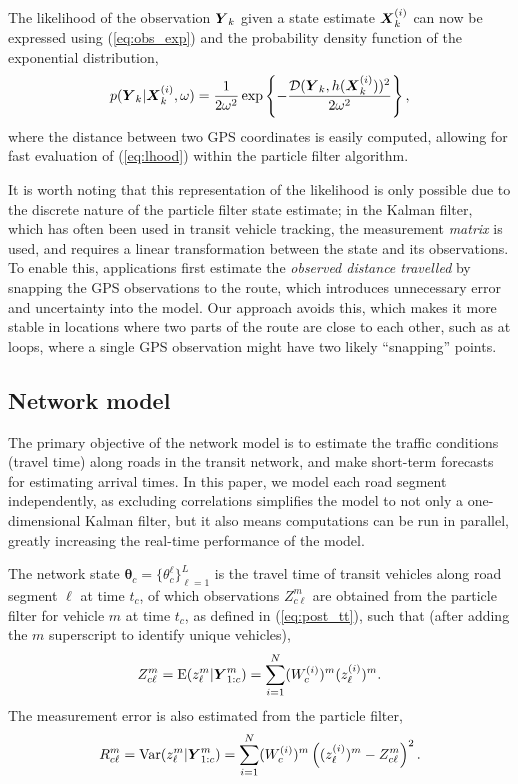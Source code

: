 The likelihood of the observation $\mbox{$\boldsymbol{Y}$}_k$ given a state estimate $\mbox{$\boldsymbol{X}$}_k^{(i)}$
can now be expressed using (\ref{eq:obs_exp}) 
and the probability density function of the exponential distribution,
\begin{equation}
\label{eq:lhood}
p(\mbox{$\boldsymbol{Y}$}_k | \mbox{$\boldsymbol{X}$}_k^{(i)}, \omega) =
\frac{1}{2\omega^2}\exp\left\{
    -\frac{\mathcal{D}(\mbox{$\boldsymbol{Y}$}_k, h(\mbox{$\boldsymbol{X}$}_k^{(i)}))^2}{2\omega^2}
\right\},
\end{equation}
where the distance between two GPS coordinates is easily computed,
allowing for fast evaluation of (\ref{eq:lhood}) within the particle filter algorithm.


It is worth noting that this representation of the likelihood is only
possible due to the discrete nature of the particle filter state estimate;
in the Kalman filter, which has often been used in transit vehicle tracking,
the measurement \emph{matrix} is used, and requires a linear
transformation between the state and its observations.
To enable this, applications first estimate the \emph{observed distance travelled}
by snapping the GPS observations to the route,
which introduces unnecessary error and uncertainty into the model.
Our approach avoids this, which makes it more stable in locations where two 
parts of the route are close to each other,
such as at loops, where a single GPS observation might have two likely ``snapping'' points.


\subsection{Network model}
\label{sec:kf}

The primary objective of the network model is to estimate the \rt traffic conditions
(travel time) along roads in the transit network, 
and make short-term forecasts for estimating arrival times.
In this paper, we model each road segment independently,
as excluding correlations simplifies the model to not only a one-dimensional Kalman filter,
but it also means computations can be run in parallel,
greatly increasing the real-time performance of the model.


The network state $\boldsymbol\theta_c = \{\theta_c^\ell\}_{\ell = 1}^L$ is the travel time 
of transit vehicles along road segment $\ell$ at time $t_c$,
of which observations $Z_{c\ell}^{m}$
are obtained from the particle filter for vehicle $m$ at time $t_c$,
as defined in (\ref{eq:post_tt}), such that 
(after adding the $m$ superscript to identify unique vehicles), 
\begin{equation}
\label{eq:tt_obs_mean}
Z_{c\ell}^{m} = \mathrm{E}(z_{\ell}^{m} | \mbox{$\boldsymbol{Y}$}^m_{1:c}) = 
\sum_{i=1}^N (W_c^{(i)})^m (z_\ell^{(i)})^{m}.
\end{equation}
The measurement error is also estimated from the particle filter,
\begin{equation}
\label{eq:tt_obs_err}
R_{c\ell}^m = \mathrm{Var}(z_{\ell}^{m} | \mbox{$\boldsymbol{Y}$}^m_{1:c}) = 
\sum_{i=1}^N (W_c^{(i)})^m \left((z_\ell^{(i)})^{m} - Z_{c\ell}^{m}\right)^2.
\end{equation}

